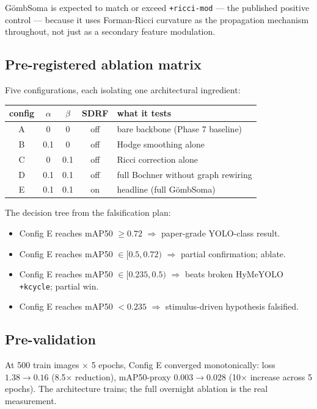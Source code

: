 \documentclass[11pt,a4paper]{article}
\newcommand{\GS}{G\"ombSoma}
\begin{document}
\GS{} is expected to match or exceed \texttt{+ricci-mod} —
the published positive control — because it uses Forman-Ricci
curvature as the propagation mechanism throughout, not just as a
secondary feature modulation.

\subsection{Pre-registered ablation matrix}

Five configurations, each isolating one architectural ingredient:

\begin{center}
\begin{tabular}{cccc p{6cm}}
\toprule
config & $\alpha$ & $\beta$ & SDRF & what it tests \\
\midrule
A & 0   & 0   & off & bare backbone (Phase 7 baseline) \\
B & 0.1 & 0   & off & Hodge smoothing alone \\
C & 0   & 0.1 & off & Ricci correction alone \\
D & 0.1 & 0.1 & off & full Bochner without graph rewiring \\
E & 0.1 & 0.1 & on  & headline (full \GS) \\
\bottomrule
\end{tabular}
\end{center}

The decision tree from the falsification plan:

\begin{itemize}
\item Config E reaches mAP50 $\geq 0.72$ $\Rightarrow$ paper-grade YOLO-class result.
\item Config E reaches mAP50 $\in [0.5, 0.72)$ $\Rightarrow$ partial confirmation; ablate.
\item Config E reaches mAP50 $\in [0.235, 0.5)$ $\Rightarrow$ beats broken HyMeYOLO \texttt{+kcycle}; partial win.
\item Config E reaches mAP50 $< 0.235$ $\Rightarrow$ stimulus-driven hypothesis falsified.
\end{itemize}

\subsection{Pre-validation}

At 500 train images $\times$ 5 epochs, Config E converged
monotonically: loss $1.38 \to 0.16$ (8.5$\times$ reduction),
mAP50-proxy $0.003 \to 0.028$ (10$\times$ increase across 5
epochs). The architecture trains; the full overnight ablation is
the real measurement.
\end{document}
